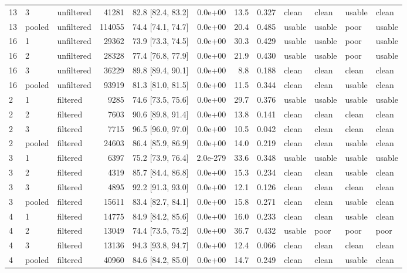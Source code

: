 \begin{longtable}{lllrrrrrllll}
13 & 3 & unfiltered & 41281 & 82.8 [82.4, 83.2] & 0.0e+00 & 13.5 & 0.327 & clean & clean & usable & clean \\
13 & pooled & unfiltered & 114055 & 74.4 [74.1, 74.7] & 0.0e+00 & 20.4 & 0.485 & usable & usable & poor & usable \\
16 & 1 & unfiltered & 29362 & 73.9 [73.3, 74.5] & 0.0e+00 & 30.3 & 0.429 & usable & usable & poor & usable \\
16 & 2 & unfiltered & 28328 & 77.4 [76.8, 77.9] & 0.0e+00 & 21.9 & 0.430 & usable & usable & poor & usable \\
16 & 3 & unfiltered & 36229 & 89.8 [89.4, 90.1] & 0.0e+00 & 8.8 & 0.188 & clean & clean & clean & clean \\
16 & pooled & unfiltered & 93919 & 81.3 [81.0, 81.5] & 0.0e+00 & 11.5 & 0.344 & clean & clean & usable & clean \\
2 & 1 & filtered & 9285 & 74.6 [73.5, 75.6] & 0.0e+00 & 29.7 & 0.376 & usable & usable & usable & usable \\
2 & 2 & filtered & 7603 & 90.6 [89.8, 91.4] & 0.0e+00 & 13.8 & 0.141 & clean & clean & clean & clean \\
2 & 3 & filtered & 7715 & 96.5 [96.0, 97.0] & 0.0e+00 & 10.5 & 0.042 & clean & clean & clean & clean \\
2 & pooled & filtered & 24603 & 86.4 [85.9, 86.9] & 0.0e+00 & 14.0 & 0.219 & clean & clean & usable & clean \\
3 & 1 & filtered & 6397 & 75.2 [73.9, 76.4] & 2.0e-279 & 33.6 & 0.348 & usable & usable & usable & usable \\
3 & 2 & filtered & 4319 & 85.7 [84.4, 86.8] & 0.0e+00 & 15.3 & 0.234 & clean & clean & usable & clean \\
3 & 3 & filtered & 4895 & 92.2 [91.3, 93.0] & 0.0e+00 & 12.1 & 0.126 & clean & clean & clean & clean \\
3 & pooled & filtered & 15611 & 83.4 [82.7, 84.1] & 0.0e+00 & 15.8 & 0.271 & clean & clean & usable & clean \\
4 & 1 & filtered & 14775 & 84.9 [84.2, 85.6] & 0.0e+00 & 16.0 & 0.233 & clean & clean & usable & clean \\
4 & 2 & filtered & 13049 & 74.4 [73.5, 75.2] & 0.0e+00 & 36.7 & 0.432 & usable & poor & poor & poor \\
4 & 3 & filtered & 13136 & 94.3 [93.8, 94.7] & 0.0e+00 & 12.4 & 0.066 & clean & clean & clean & clean \\
4 & pooled & filtered & 40960 & 84.6 [84.2, 85.0] & 0.0e+00 & 14.7 & 0.249 & clean & clean & usable & clean \\

\end{longtable}
